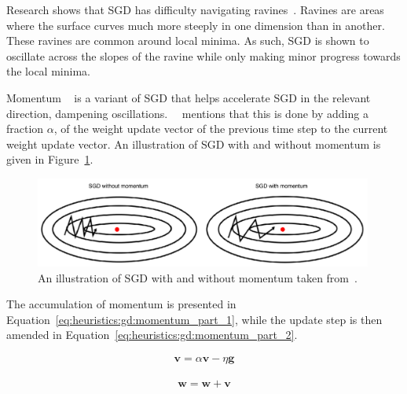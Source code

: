 Research shows that \acs{SGD} has difficulty navigating ravines~\cite{ref:sutton:1986}. Ravines are areas where the surface curves much more steeply in one dimension than in another. These ravines are common around local minima. As such, \acs{SGD} is shown to oscillate across the slopes of the ravine while only making minor progress towards the local minima.

\Acs{Momentum} ~\cite{ref:qian:1999} is a variant of \acs{SGD} that helps accelerate \acs{SGD} in the relevant direction, dampening oscillations.~\citeauthor{ref:ruder:2016}~\cite{ref:ruder:2016} mentions that this is done by adding a fraction $\alpha$, of the weight update vector of the previous time step to the current weight update vector. An illustration of \acs{SGD} with and without momentum is given in Figure~\ref{fig:heuristics:gd:sgd_with_and_without_momentum}.

\begin{figure}[htbp]
	\centering
	\includegraphics[width=0.99\textwidth]{images/sgd_with_and_without_momentum.pdf}
	\caption{An illustration of \acf{SGD} with and without momentum taken from~\cite{ref:du:2019}.}
	\label{fig:heuristics:gd:sgd_with_and_without_momentum}
\end{figure}

The accumulation of momentum is presented in Equation~\eqref{eq:heuristics:gd:momentum_part_1}, while the update step is then amended in Equation~\eqref{eq:heuristics:gd:momentum_part_2}.

\begin{equation}
	\label{eq:heuristics:gd:momentum_part_1}
	\begin{split}
		\boldsymbol{v} = \alpha \boldsymbol{v} - \eta \boldsymbol{g}
	\end{split}
\end{equation}

\begin{equation}
	\label{eq:heuristics:gd:momentum_part_2}
	\begin{split}
		\boldsymbol{w} = \boldsymbol{w} + \boldsymbol{v}
	\end{split}
\end{equation}

